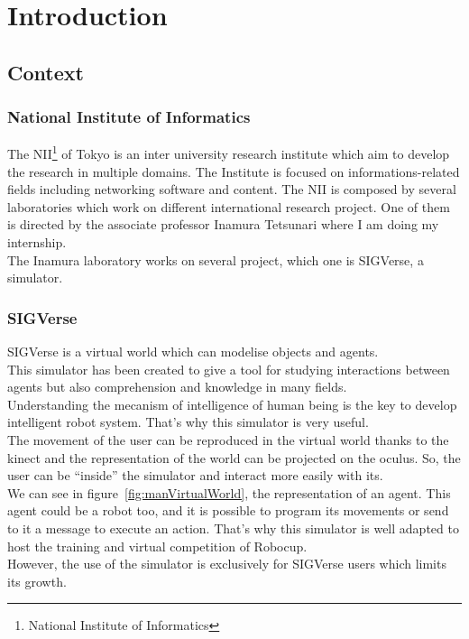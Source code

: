 \chapter{Introduction}
\setlength{\parskip}{2.5ex plus .4ex minus .4ex}
\section{Context}
\subsection{National Institute of Informatics}
The NII\footnote{National Institute of Informatics} of Tokyo is an inter university research institute which aim to develop the research in multiple domains. The Institute is focused on informations-related fields including networking software and content.
The NII is composed by several laboratories which work on different international research project. One of them is directed by the associate professor Inamura Tetsunari where I am doing my internship.\\
The Inamura laboratory works on several project, which one is SIGVerse, a simulator.

\subsection{SIGVerse}
SIGVerse is a virtual world which can modelise objects and agents.\\
This simulator has been created to give a tool for studying interactions between agents but also comprehension and knowledge in many fields.\\
Understanding the mecanism of intelligence of human being is the key to develop intelligent robot system. That's why this simulator is very useful.\\
The movement of the user can be reproduced in the virtual world thanks to the kinect and the representation of the world can be projected on the oculus. So, the user can be ``inside'' the simulator and interact more easily with its.\\
We can see in figure~\ref{fig:manVirtualWorld}, the representation of an agent. This agent could be a robot too, and it is possible to program its movements or send to it a message to execute an action. That's why this simulator is well adapted to host the training and virtual competition of Robocup.\\
However, the use of the simulator is exclusively for SIGVerse users which limits its growth.\\

